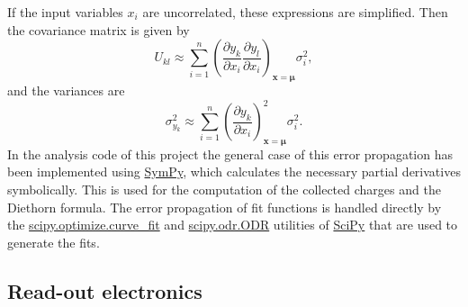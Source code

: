 \documentclass[a4paper]{article}
\newenvironment{todo}{
\color{red}
}
{
}
\begin{document}
If the input variables $x_i$ are uncorrelated, these expressions are simplified.
Then the covariance matrix is given by
\begin{equation}
U_{kl} \approx \sum_{i=1}^n \left( \frac{\partial y_k}{\partial x_i} \frac{\partial y_l}{\partial x_i} \right)_{\mathbf{x}=\mathbf{\mu}} \sigma_i^2,
\end{equation}
and the variances are \cite[p. 20--22]{cowan_statistical_1998}
\begin{equation}
\sigma_{y_k}^2 \approx \sum_{i=1}^n \left( \frac{\partial y_k}{\partial x_i} \right)_{\mathbf{x}=\mathbf{\mu}}^2 \sigma_i^2.
\label{eq:variance}
\end{equation}
In the analysis code of this project the general case of this error propagation has been implemented using
\href{https://www.sympy.org/}{SymPy},
which calculates the necessary partial derivatives symbolically.
This is used for the computation of the collected charges and the Diethorn formula.
The error propagation of fit functions is handled directly by the
\href{https://docs.scipy.org/doc/scipy/reference/generated/scipy.optimize.curve_fit.html}{scipy.optimize.curve\_fit}
and
\href{https://docs.scipy.org/doc/scipy/reference/generated/scipy.odr.ODR.html}{scipy.odr.ODR} utilities of
\href{https://www.scipy.org/}{SciPy}
that are used to generate the fits.
\cite{repo}

\iffalse
\subsection{Read-out electronics}
\label{electronics}
\end{document}
